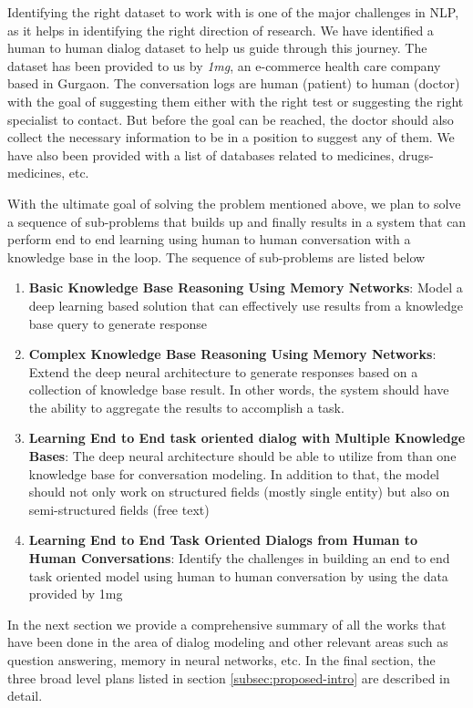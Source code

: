 Identifying the right dataset to work with is one of the major challenges in NLP, as it helps in identifying the right direction of research. We have identified a human to human dialog dataset to help us guide through this journey. The dataset has been provided to us by \textit{1mg}, an e-commerce health care company based in Gurgaon. The conversation logs are human (patient) to human (doctor) with the goal of suggesting them either with the right test or suggesting the right specialist to contact. But before the goal can be reached, the doctor should also collect the necessary information to be in a position to suggest any of them. We have also been provided with a list of databases related to medicines, drugs-medicines, etc.

With the ultimate goal of solving the problem mentioned above, we plan to solve a sequence of sub-problems that builds up and finally results in a system that can perform end to end learning using human to human conversation with a knowledge base in the loop. The sequence of sub-problems are listed below

\begin{enumerate}
	\item \textbf{Basic Knowledge Base Reasoning Using Memory Networks}: Model a deep learning based solution that can effectively use results from a knowledge base query to generate response
	\item \textbf{Complex Knowledge Base Reasoning Using Memory Networks}: Extend the deep neural architecture to generate responses based on a collection of  knowledge base result. In other words, the system should have the ability to aggregate the results to accomplish a task. 
	\item \textbf{Learning End to End task oriented dialog with Multiple Knowledge Bases}: The deep neural architecture should be able to utilize from than one knowledge base for conversation modeling. In addition to that, the model should not only work on structured fields (mostly single entity) but also on semi-structured fields (free text)
	\item \textbf{Learning End to End Task Oriented Dialogs from Human to Human Conversations}: Identify the challenges in building an end to end task oriented model using human to human conversation by using the data provided by 1mg
\end{enumerate}

In the next section we provide a comprehensive summary of all the works that have been done in the area of dialog modeling and other relevant areas such as question answering, memory in neural networks, etc. In the final section, the three broad level plans listed in section \ref{subsec:proposed-intro} are described in detail.

